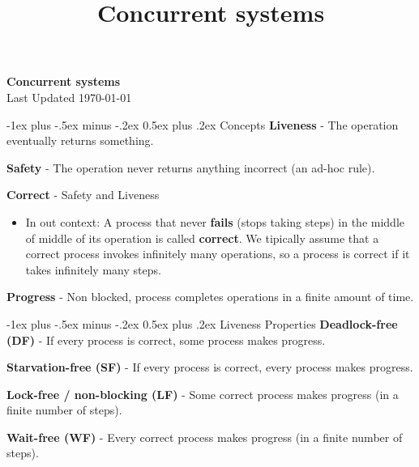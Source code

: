 \documentclass[10pt,landscape]{article}
\title{Concurrent systems}
\makeatletter
\renewcommand{\section}{\@startsection{section}{1}{0mm}%
                                {-1ex plus -.5ex minus -.2ex}%
                                {0.5ex plus .2ex}%
                                {\normalfont\large\bfseries}}
\renewcommand{\subsection}{\@startsection{subsection}{2}{0mm}%
                                {-1ex plus -.5ex minus -.2ex}%
                                {0.5ex plus .2ex}%
                                {\normalfont\normalsize\bfseries}}
\makeatother
\begin{document}
\raggedright
\footnotesize

\begin{center}
    \vspace{-50mm}
    \Large{\vspace{-15mm}\textbf{Concurrent systems}} \\
    \footnotesize{Last Updated \today}
    \vspace{-.4mm}
\end{center}
\begin{multicols}{3}
    \setlength{\premulticols}{1pt}
    \setlength{\postmulticols}{1pt}
    \setlength{\multicolsep}{1pt}
    \setlength{\columnsep}{2pt}
    \section{Concepts}
    \textbf{Liveness} - The operation eventually returns something.
    
    \textbf{Safety} - The operation never returns anything incorrect (an ad-hoc rule).
    
    \textbf{Correct} - Safety and Liveness
    \begin{itemize}[label={--},leftmargin=4mm]
        \vspace{-1mm}
        \itemsep -.4mm
        \item In out context: A process that never \textbf{fails} (stops taking steps) in the middle of middle of its operation is called \textbf{correct}. We tipically assume that a correct process invokes infinitely many operations, so a process is correct if it takes infinitely many steps.

    \end{itemize}
    \textbf{Progress} - Non blocked, process completes operations in a finite amount of time.

    \subsection{Liveness Properties}
    \textbf{Deadlock-free (DF)} - If every process is correct, some process makes progress.

    \textbf{Starvation-free (SF)} - If every process is correct, every process makes progress.

    \textbf{Lock-free / non-blocking (LF)} - Some correct process makes progress (in a finite number of steps).

    \textbf{Wait-free (WF)} - Every correct process makes progress (in a finite number of steps).


\end{multicols}
\end{document}
